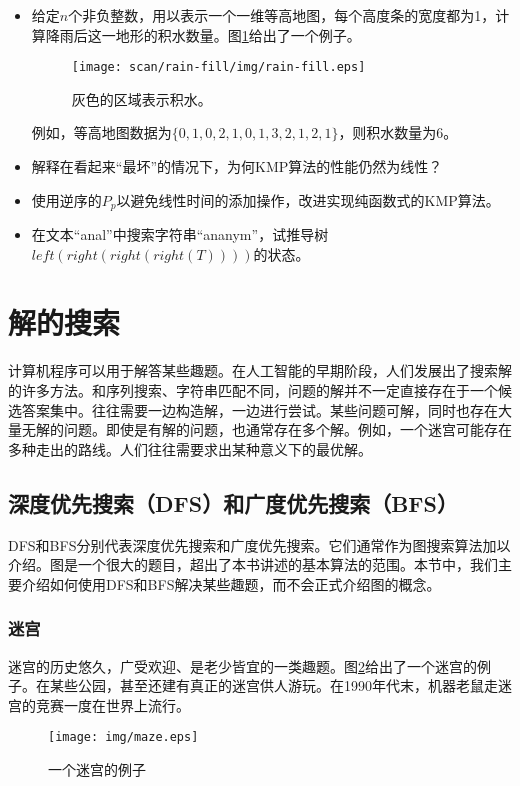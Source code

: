 \documentclass[UTF8]{article}
\begin{document}
\begin{Exercise}
\begin{itemize}
\item 给定$n$个非负整数，用以表示一个一维等高地图，每个高度条的宽度都为1，计算降雨后这一地形的积水数量。图\ref{fig:rain-fill}给出了一个例子。
\begin{figure}[htbp]
 \centering
 \texttt{[image: scan/rain-fill/img/rain-fill.eps]}
 \caption{灰色的区域表示积水。}
 \label{fig:rain-fill}
\end{figure}
例如，等高地图数据为$\{0,1,0,2,1,0,1,3,2,1,2,1\}$，则积水数量为6。
\item 解释在看起来“最坏”的情况下，为何KMP算法的性能仍然为线性？
\item 使用逆序的$P_p$以避免线性时间的添加操作，改进实现纯函数式的KMP算法。
\item 在文本“anal”中搜索字符串“ananym”，试推导树$left(right(right(right(T))))$的状态。
\end{itemize}
\end{Exercise}

\section{解的搜索}

计算机程序可以用于解答某些趣题。在人工智能的早期阶段，人们发展出了搜索解的许多方法。和序列搜索、字符串匹配不同，问题的解并不一定直接存在于一个候选答案集中。往往需要一边构造解，一边进行尝试。某些问题可解，同时也存在大量无解的问题。即使是有解的问题，也通常存在多个解。例如，一个迷宫可能存在多种走出的路线。人们往往需要求出某种意义下的最优解。

\subsection{深度优先搜索（DFS）和广度优先搜索（BFS）}
 
DFS和BFS分别代表深度优先搜索和广度优先搜索。它们通常作为图搜索算法加以介绍。图是一个很大的题目，超出了本书讲述的基本算法的范围。本节中，我们主要介绍如何使用DFS和BFS解决某些趣题，而不会正式介绍图的概念。

\subsubsection{迷宫}
迷宫的历史悠久，广受欢迎、是老少皆宜的一类趣题。图\ref{fig:maze}给出了一个迷宫的例子。在某些公园，甚至还建有真正的迷宫供人游玩。在1990年代末，机器老鼠走迷宫的竞赛一度在世界上流行。

\begin{figure}[htbp]
 \centering
 \texttt{[image: img/maze.eps]}
 \caption{一个迷宫的例子}
 \label{fig:maze}
\end{figure}
\end{document}
